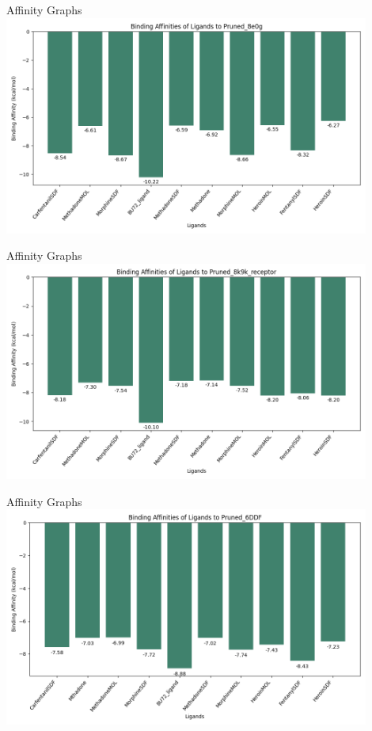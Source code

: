\documentclass[aspectratio=169]{beamer}
\begin{document}
\begin{frame}{Affinity Graphs}
\includegraphics[width=12cm]{img/Graphs/Pruned_8e0g_affinities.png}
\end{frame}

\begin{frame}{Affinity Graphs}
\includegraphics[width=12cm]{img/Graphs/Pruned_8k9k_receptor_affinities.png}
\end{frame}
\begin{frame}{Affinity Graphs}
\includegraphics[width=12cm]{img/Graphs/Pruned_6DDF_affinities.png}
\end{frame}
\end{document}
